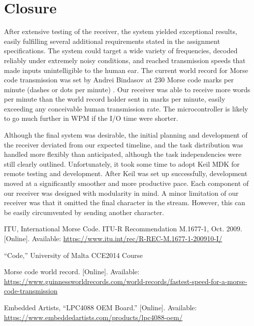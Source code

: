 \documentclass[head=13.6pt]{cce2014-design}
\begin{document}
\section{Closure}
After extensive testing of the receiver, the system yielded exceptional results, easily fulfilling several additional requirements stated in the assignment specifications. The system could target a wide variety of frequencies, decoded reliably under extremely noisy conditions, and reached transmission speeds that made inputs unintelligible to the human ear. The current world record for Morse code transmission was set by Andrei Bindasov at 230 Morse code marks per minute (dashes or dots per minute) \cite{morseworldrecord}. Our receiver was able to receive more words per minute than the world record holder sent in marks per minute, easily exceeding any conceivable human transmission rate. The microcontroller is likely to go much further in WPM if the I/O time were shorter.

Although the final system was desirable, the initial planning and development of the receiver deviated from our expected timeline, and the task distribution was handled more flexibly than anticipated, although the task independencies were still clearly outlined. Unfortunately, it took some time to adopt Keil MDK for remote testing and development. After Keil was set up successfully, development moved at a significantly smoother and more productive pace. Each component of our receiver was designed with modularity in mind. A minor limitation of our receiver was that it omitted the final character in the stream. However, this can be easily circumvented by sending another character.

\nocite{itu}

\begin{thebibliography}{9}

ITU, International Morse Code. ITU-R Recommendation M.1677-1, Oct. 2009. [Online]. Available: \url{https://www.itu.int/rec/R-REC-M.1677-1-200910-I/}

“Code,” University of Malta CCE2014 Course

Morse code world record. [Online]. Available: \url{https://www.guinnessworldrecords.com/world-records/fastest-speed-for-a-morse-code-transmission}

Embedded Artists, “LPC4088 OEM Board.” [Online]. Available: \url{https://www.embeddedartists.com/products/lpc4088-oem/}

\end{thebibliography}
\end{document}
